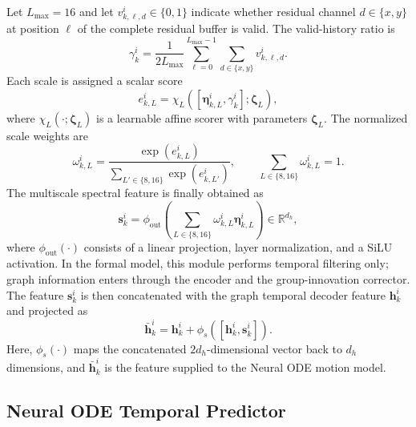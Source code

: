 \documentclass[10pt,doublecolumn]{IEEEtaes}
\begin{document}
Let $L_{\max}=16$ and let $v_{k,\ell,d}^{i}\in\{0,1\}$ indicate whether residual channel $d\in\{x,y\}$ at position $\ell$ of the complete residual buffer is valid. The valid-history ratio is
\begin{equation}
\gamma_{k}^{i}=\frac{1}{2L_{\max}}
\sum_{\ell=0}^{L_{\max}-1}\sum_{d\in\{x,y\}}v_{k,\ell,d}^{i}.
\label{eq:residual_valid_ratio}
\end{equation}
Each scale is assigned a scalar score
\begin{equation}
e_{k,L}^{i}=\chi_L\!\left(
[\boldsymbol{\eta}_{k,L}^{i},\gamma_{k}^{i}];\boldsymbol{\zeta}_L
\right),
\label{eq:scale_score}
\end{equation}
where $\chi_L(\cdot;\boldsymbol{\zeta}_L)$ is a learnable affine scorer with parameters $\boldsymbol{\zeta}_L$. The normalized scale weights are
\begin{equation}
\omega_{k,L}^{i}=\frac{\exp(e_{k,L}^{i})}
{\sum_{L'\in\{8,16\}}\exp(e_{k,L'}^{i})},
\qquad \sum_{L\in\{8,16\}}\omega_{k,L}^{i}=1.
\label{eq:scale_weight}
\end{equation}
The multiscale spectral feature is finally obtained as
\begin{equation}
\mathbf{s}_{k}^{i}=\phi_{\mathrm{out}}\!\left(
\sum_{L\in\{8,16\}}\omega_{k,L}^{i}\boldsymbol{\eta}_{k,L}^{i}
\right)\in\mathbb{R}^{d_h},
\label{eq:multiscale_spectral_feature}
\end{equation}
where $\phi_{\mathrm{out}}(\cdot)$ consists of a linear projection, layer normalization, and a SiLU activation. In the formal model, this module performs temporal filtering only; graph information enters through the encoder and the group-innovation corrector. The feature $\mathbf{s}_{k}^{i}$ is then concatenated with the graph temporal decoder feature $\mathbf{h}_{k}^{i}$ and projected as
\begin{equation}
\bar{\mathbf{h}}_{k}^{i}=\mathbf{h}_{k}^{i}+
\phi_s\!\left([\mathbf{h}_{k}^{i},\mathbf{s}_{k}^{i}]\right).
\label{eq:concat_fusion}
\end{equation}
Here, $\phi_s(\cdot)$ maps the concatenated $2d_h$-dimensional vector back to $d_h$ dimensions, and $\bar{\mathbf{h}}_{k}^{i}$ is the feature supplied to the Neural ODE motion model.

\subsection{Neural ODE Temporal Predictor}
\end{document}
